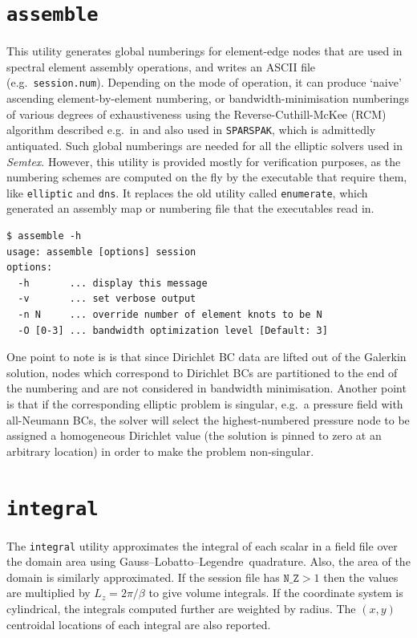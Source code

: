 \documentclass[11pt]{report}
\newcommand{\Semtex}{\emph{Semtex}} \newcommand{\Dog}{\emph{Dog}}
\newcommand{\eg}{e.g.\ } \newcommand{\CC}{\mathrm{c.c.}}
\newcommand\GLL{Gauss--Lobatto--Legendre}
\begin{document}
\section{\texttt{assemble}}
\label{sec.assemble}

This utility generates global numberings for element-edge nodes that
are used in spectral element assembly operations, and writes an ASCII
file (\eg \verb|session.num|). Depending on the mode of operation, it
can produce `naive' ascending element-by-element numbering, or
bandwidth-minimisation numberings of various degrees of exhaustiveness
using the Reverse-Cuthill-McKee (RCM) algorithm described \eg in
\citet{george81} and also used in \verb|SPARSPAK|, which is admittedly
antiquated.  Such global numberings are needed for all the elliptic
solvers used in \Semtex.  However, this utility is provided mostly for
verification purposes, as the numbering schemes are computed on the
fly by the executable that require them, like \verb+elliptic+ and
\verb+dns+.  It replaces the old utility called \verb+enumerate+,
which generated an assembly map or numbering file that the executables
read in.
%
{\small
\begin{verbatim}
$ assemble -h
usage: assemble [options] session
options:
  -h       ... display this message
  -v       ... set verbose output
  -n N     ... override number of element knots to be N
  -O [0-3] ... bandwidth optimization level [Default: 3]
\end{verbatim}
}
%
One point to note is is that since Dirichlet BC data are lifted out of
the Galerkin solution, nodes which correspond to Dirichlet BCs are
partitioned to the end of the numbering and are not considered in
bandwidth minimisation.  Another point is that if the corresponding
elliptic problem is singular, \eg a pressure field with all-Neumann
BCs, the solver will select the highest-numbered pressure node to be
assigned a homogeneous Dirichlet value (\ie the solution is pinned to
zero at an arbitrary location) in order to make the problem non-singular.

\section{\texttt{integral}}
\label{sec.integral}

The \verb|integral| utility approximates the integral of each scalar
in a field file over the domain area using \GLL\ quadrature.  Also,
the area of the domain is similarly approximated.  If the session file
has $\texttt{N\_Z}>1$ then the values are multiplied by $L_z =
2\pi/\beta$ to give volume integrals.  If the coordinate system is
cylindrical, the integrals computed further are weighted by radius.
The $(x,y)$ centroidal locations of each integral are also reported.
\end{document}
